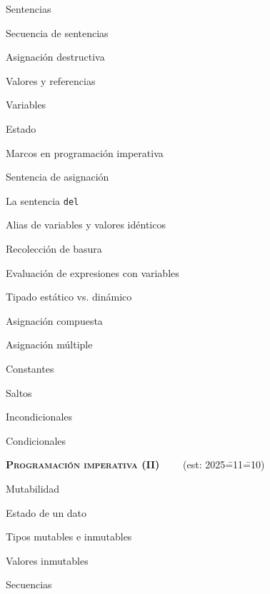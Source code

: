 \begin{longenum}
\begin{longenum}
\begin{longenum}
            \item Sentencias
            \item Secuencia de sentencias
        \end{longenum}
        \item Asignación destructiva
        \begin{longenum}
            \item Valores y referencias
            \item Variables
            \item Estado
            \item Marcos en programación imperativa
            \item Sentencia de asignación
            \item La sentencia \texttt{del}
            \item Alias de variables y valores idénticos
            \item Recolección de basura
            \item Evaluación de expresiones con variables
            \item Tipado estático vs. dinámico
            \item Asignación compuesta
            \item Asignación múltiple
            \item Constantes
        \end{longenum}
        \item Saltos
        \begin{longenum}
            \item Incondicionales
            \item Condicionales
        \end{longenum}
    \end{longenum}
    \item \textbf{\textsc{Programación imperativa (II)}} \ \ \ \ (est: 2025\==11\==10)
    \begin{longenum}
        \item Mutabilidad
        \begin{longenum}
            \item Estado de un dato
            \item Tipos mutables e inmutables
            \begin{longenum}
                \item Valores inmutables
                \begin{longenum}
                    \item Secuencias

\end{longenum}
\end{longenum}
\end{longenum}
\end{longenum}
\end{longenum}
